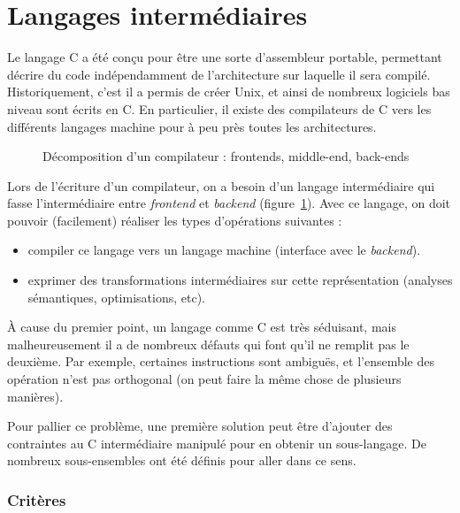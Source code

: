 \section{Langages intermédiaires}

Le langage C \cite{KandR,AnsiC} a été conçu pour être une sorte d'assembleur
portable, permettant décrire du code indépendamment de l'architecture sur
laquelle il sera compilé. Historiquement, c'est il a permis de créer Unix, et
ainsi de nombreux logiciels bas niveau sont écrits en C. En particulier, il
existe des compilateurs de C vers les différents langages machine pour à peu
près toutes les architectures.

\begin{figure}

  

  \caption{Décomposition d'un compilateur : frontends, middle-end, back-ends}
  \label{fig:middle-end}
\end{figure}

Lors de l'écriture d'un compilateur, on a besoin d'un langage intermédiaire qui
fasse l'intermédiaire entre \emph{frontend} et \emph{backend}
(figure~\ref{fig:middle-end}). Avec ce langage, on doit pouvoir (facilement)
réaliser les types d'opérations suivantes :

\begin{itemize}
\item
  compiler ce langage vers un langage machine (interface avec le
  \emph{backend}).
\item
  exprimer des transformations intermédiaires sur cette représentation
  (analyses sémantiques, optimisations, etc).
\end{itemize}

À cause du premier point, un langage comme C est très séduisant, mais
malheureusement il a de nombreux défauts qui font qu'il ne remplit pas le
deuxième. Par exemple, certaines instructions sont ambiguës, et l'ensemble des
opération n'est pas orthogonal (on peut faire la même chose de plusieurs
manières).

Pour pallier ce problème, une première solution peut être d'ajouter des
contraintes au C intermédiaire manipulé pour en obtenir un sous-langage. De
nombreux sous-ensembles ont été définis pour aller dans ce sens.

\subsubsection{Critères}

